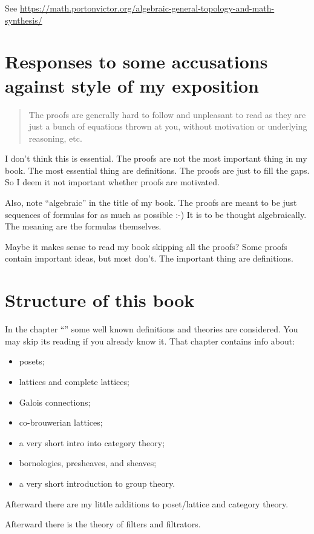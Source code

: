 See \url{https://math.portonvictor.org/algebraic-general-topology-and-math-synthesis/}

\section{Responses to some accusations against style of my exposition}

\begin{quote}
The proofs are generally hard to follow and unpleasant to read as they are just a bunch of equations thrown at you, without motivation or underlying reasoning, etc.
\end{quote}

I don't think this is essential. The proofs are not the most important thing in my book. The most essential thing are definitions. The proofs are just to fill the gaps. So I deem it not important whether proofs are motivated.

Also, note ``algebraic'' in the title of my book. The proofs are meant to be just sequences of formulas for as much as possible :-) It is to be thought algebraically. The meaning are the formulas themselves.

Maybe it makes sense to read my book skipping all the proofs? Some proofs contain important ideas, but most don't. The important thing are definitions.

\section{Structure of this book}

In the chapter ``'' some well known definitions
and theories are considered. You may skip its reading if you already
know it. That chapter contains info about:
\begin{itemize}
\item posets;
\item lattices and complete lattices;
\item Galois connections;
\item co-brouwerian lattices;
\item a very short intro into category theory;
\item bornologies, presheaves, and sheaves;
\item a very short introduction to group theory.
\end{itemize}
Afterward there are my little additions to poset/lattice and category
theory.

Afterward there is the theory of filters and filtrators.

